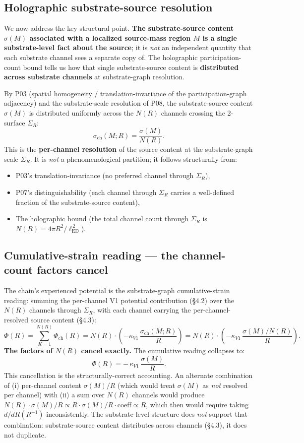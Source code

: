 \documentclass[11pt,a4paper]{article}
\begin{document}
\subsection{Holographic substrate-source resolution}

We now address the key structural point. \textbf{The substrate-source content $\sigma(M)$ associated with a localized source-mass region $M$ is a single substrate-level fact about the source}; it is \emph{not} an independent quantity that each substrate channel sees a separate copy of. The holographic participation-count bound tells us how that single substrate-source content is \textbf{distributed across substrate channels} at substrate-graph resolution.

By P03 (spatial homogeneity / translation-invariance of the participation-graph adjacency) and the substrate-scale resolution of P08, the substrate-source content $\sigma(M)$ is distributed uniformly across the $N(R)$ channels crossing the 2-surface $\Sigma_R$:
\[
\sigma_\mathrm{ch}(M; R) = \frac{\sigma(M)}{N(R)}.
\]
This is the \textbf{per-channel resolution} of the source content at the substrate-graph scale $\Sigma_R$. It is \emph{not} a phenomenological partition; it follows structurally from:

\begin{itemize}[noitemsep]
\item P03's translation-invariance (no preferred channel through $\Sigma_R$),
\item P07's distinguishability (each channel through $\Sigma_R$ carries a well-defined fraction of the substrate-source content),
\item The holographic bound (the total channel count through $\Sigma_R$ is $N(R) = 4\pi R^2/\ell_\mathrm{ED}^{\,2}$).
\end{itemize}

\subsection{Cumulative-strain reading --- the channel-count factors cancel}

The chain's experienced potential is the substrate-graph cumulative-strain reading: summing the per-channel V1 potential contribution (\S4.2) over the $N(R)$ channels through $\Sigma_R$, with each channel carrying the per-channel-resolved source content (\S4.3):
\[
\Phi(R) = \sum_{K=1}^{N(R)} \Phi_\mathrm{ch}(R) = N(R) \cdot \left(-\kappa_{V1}\,\frac{\sigma_\mathrm{ch}(M; R)}{R}\right) = N(R) \cdot \left(-\kappa_{V1}\,\frac{\sigma(M)/N(R)}{R}\right).
\]
\textbf{The factors of $N(R)$ cancel exactly.} The cumulative reading collapses to:
\[
\boxed{\Phi(R) = -\,\kappa_{V1}\,\frac{\sigma(M)}{R}.}
\]
This cancellation is the structurally-correct accounting. An alternate combination of (i) per-channel content $\sigma(M)/R$ (which would treat $\sigma(M)$ as \emph{not} resolved per channel) with (ii) a sum over $N(R)$ channels would produce $N(R) \cdot \sigma(M)/R \propto R \cdot \sigma(M)/R \cdot \mathrm{coeff} \propto R$, which then would require taking $d/dR(R^{-1})$ inconsistently. The substrate-level structure does \emph{not} support that combination: substrate-source content distributes across channels (\S4.3), it does not duplicate.
\end{document}
